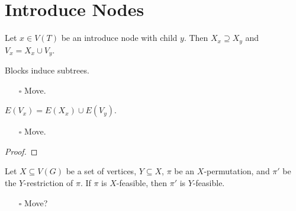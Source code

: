 \documentclass[fontsize=11pt,paper=a4]{book}
\begin{document}
\section{Introduce Nodes}
\label{sec:orgfb509dc}

Let \(x\in V(T)\) be an introduce node with child \(y\).
Then \(X_x\supseteq X_y\) and \(V_x=X_x\cup V_y\).

\begin{lem}
Blocks induce subtrees.
\label{org9dded06}
\end{lem}

\begin{itemize}
\item[{$\square$}] Move.
\end{itemize}

\begin{lem}
\(E(V_x)=E(X_x)\cup E(V_y)\).
\label{org7d1c39f}
\end{lem}

\begin{itemize}
\item[{$\square$}] Move.
\end{itemize}

\begin{proof}
\end{proof}

\begin{lem}
Let \(X\subseteq V(G)\) be a set of vertices, \(Y\subseteq X\), \(\pi\) be an \(X\)-permutation, and \(\pi'\) be the \(Y\)-restriction of \(\pi\).
If \(\pi\) is \(X\)-feasible, then \(\pi'\) is \(Y\)-feasible.
\label{org02cd503}
\end{lem}

\begin{itemize}
\item[{$\square$}] Move?
\end{itemize}
\end{document}
